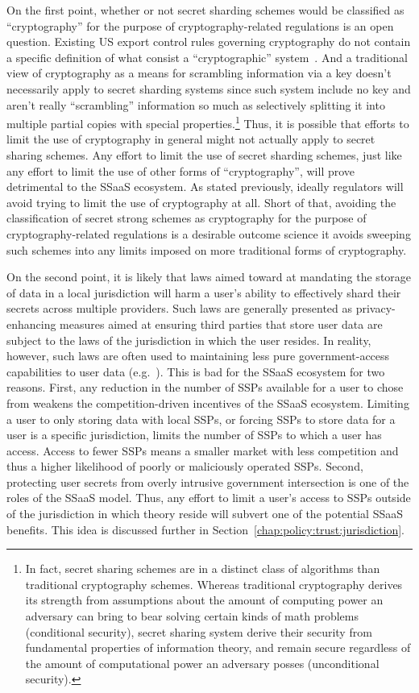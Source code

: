 On the first point, whether or not secret sharding schemes would be
classified as ``cryptography'' for the purpose of cryptography-related
regulations is an open question. Existing US export control rules
governing cryptography do not contain a specific definition of what
consist a ``cryptographic'' system~\cite{bis-encrypted}. And a
traditional view of cryptography as a means for scrambling information
via a key doesn't necessarily apply to secret sharding systems since
such system include no key and aren't really ``scrambling''
information so much as selectively splitting it into multiple partial
copies with special properties.\footnote{In fact, secret sharing
  schemes are in a distinct class of algorithms than traditional
  cryptography schemes. Whereas traditional cryptography derives its
  strength from assumptions about the amount of computing power an
  adversary can bring to bear solving certain kinds of math problems
  (conditional security), secret sharing system derive their security
  from fundamental properties of information theory, and remain secure
  regardless of the amount of computational power an adversary posses
  (unconditional security).} Thus, it is possible that efforts to
limit the use of cryptography in general might not actually apply to
secret sharing schemes. Any effort to limit the use of secret sharding
schemes, just like any effort to limit the use of other forms of
``cryptography'', will prove detrimental to the SSaaS ecosystem. As
stated previously, ideally regulators will avoid trying to limit the
use of cryptography at all. Short of that, avoiding the classification
of secret strong schemes as cryptography for the purpose of
cryptography-related regulations is a desirable outcome science it
avoids sweeping such schemes into any limits imposed on more
traditional forms of cryptography.

On the second point, it is likely that laws aimed toward at mandating
the storage of data in a local jurisdiction will harm a user's ability
to effectively shard their secrets across multiple providers. Such
laws are generally presented as privacy-enhancing measures aimed at
ensuring third parties that store user data are subject to the laws of
the jurisdiction in which the user resides. In reality, however, such
laws are often used to maintaining less pure government-access
capabilities to user data (e.g.~\cite{dergacheva2015}). This is bad
for the SSaaS ecosystem for two reasons. First, any reduction in the
number of SSPs available for a user to chose from weakens the
competition-driven incentives of the SSaaS ecosystem. Limiting a user
to only storing data with local SSPs, or forcing SSPs to store data
for a user is a specific jurisdiction, limits the number of SSPs to
which a user has access.  Access to fewer SSPs means a smaller market
with less competition and thus a higher likelihood of poorly or
maliciously operated SSPs. Second, protecting user secrets from overly
intrusive government intersection is one of the roles of the SSaaS
model. Thus, any effort to limit a user's access to SSPs outside of
the jurisdiction in which theory reside will subvert one of the
potential SSaaS benefits. This idea is discussed further in
Section~\ref{chap:policy:trust:jurisdiction}.

